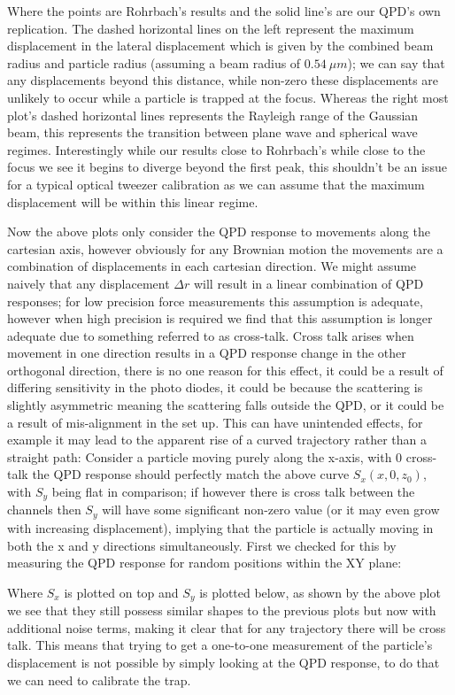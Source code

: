 Where the points are Rohrbach's results and the solid line's are our QPD's own replication. The dashed horizontal lines on the left represent the maximum displacement in the lateral displacement which is given by the combined beam radius and particle radius (assuming a beam radius of $0.54\ \mu m$); we can say that any displacements beyond this distance, while non-zero these displacements are unlikely to occur while a particle is trapped at the focus. Whereas the right most plot's dashed horizontal lines represents the Rayleigh range of the Gaussian beam, this represents the transition between plane wave and spherical wave regimes. Interestingly while our results close to Rohrbach's while close to the focus we see it begins to diverge beyond the first peak, this shouldn't be an issue for a typical optical tweezer calibration as we can assume that the maximum displacement will be within this linear regime. 

Now the above plots only consider the QPD response to movements along the cartesian axis, however obviously for any Brownian motion the movements are a combination of displacements in each cartesian direction. We might assume naively that any displacement $\Delta r$ will result in a linear combination of QPD responses; for low precision force measurements this assumption is adequate, however when high precision is required we find that this assumption is longer adequate due to something referred to as cross-talk. Cross talk arises when movement in one direction results in a QPD response change in the other orthogonal direction, there is no one reason for this effect, it could be a result of differing sensitivity in the photo diodes, it could be because the scattering is slightly asymmetric meaning the scattering falls outside the QPD, or it could be a result of mis-alignment in the set up. This can have unintended effects, for example it may lead to the apparent rise of a curved trajectory rather than a straight path: Consider a particle moving purely along the x-axis, with 0 cross-talk the QPD response should perfectly match the above curve $S_x(x,0,z_0)$, with $S_y$ being flat in comparison; if however there is cross talk between the channels then $S_y$ will have some significant non-zero value (or it may even grow with increasing displacement), implying that the particle is actually moving in both the x and y directions simultaneously.  First we checked for this by measuring the QPD response for random positions within the XY plane:

Where $S_x$ is plotted on top and $S_y$ is plotted below, as shown by the above plot we see that they still possess similar shapes to the previous plots but now with additional noise terms, making it clear that for any trajectory there will be cross talk. This means that trying to get a one-to-one measurement of the particle's displacement is not possible by simply looking at the QPD response, to do that we can need to calibrate the trap. 

